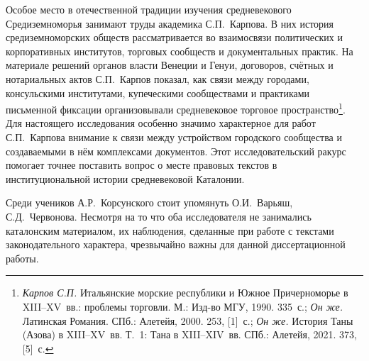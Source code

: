 Особое место в отечественной традиции изучения средневекового Средиземноморья занимают труды академика С.П.~Карпова. В них история средиземноморских обществ рассматривается во взаимосвязи политических и корпоративных институтов, торговых сообществ и документальных практик. На материале решений органов власти Венеции и Генуи, договоров, счётных и нотариальных актов С.П.~Карпов показал, как связи между городами, консульскими институтами, купеческими сообществами и практиками письменной фиксации организовывали средневековое торговое пространство\footnote{\emph{Карпов С.П.} Итальянские морские республики и Южное Причерноморье в XIII--XV~вв.: проблемы торговли. М.: Изд-во МГУ, 1990. 335~с.; \emph{Он же.} Латинская Романия. СПб.: Алетейя, 2000. 253, [1]~с.; \emph{Он же.} История Таны (Азова) в XIII--XV~вв. Т.~1: Тана в XIII--XIV~вв. СПб.: Алетейя, 2021. 373, [5]~с.}. Для настоящего исследования особенно значимо характерное для работ С.П.~Карпова внимание к связи между устройством городского сообщества и создаваемыми в нём комплексами документов. Этот исследовательский ракурс помогает точнее поставить вопрос о месте правовых текстов в институциональной истории средневековой Каталонии.

Среди учеников А.Р.~Корсунского стоит упомянуть О.И.~Варьяш, С.Д.~Червонова. Несмотря на то что оба исследователя не занимались каталонским материалом, их наблюдения, сделанные при работе с текстами законодательного характера, чрезвычайно важны для данной диссертационной работы.


